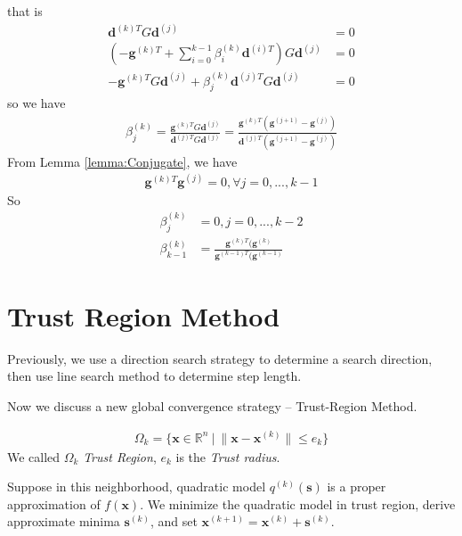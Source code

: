     that is
    \begin{align}
        \mathbf{d}^{(k)T} G \mathbf{d}^{(j)} &= 0 \\
        (-\mathbf{g}^{(k)T} + \sum_{i=0}^{k-1} \beta_i^{(k)} \mathbf{d}^{(i)T})
        G \mathbf{d}^{(j)} &= 0 \\
        -\mathbf{g}^{(k)T} G \mathbf{d}^{(j)}
        + \beta_j^{(k)}\mathbf{d}^{(j)T} G \mathbf{d}^{(j)} &= 0
    \end{align}
    so we have
    \begin{align}
        \beta_j^{(k)} = \frac{\mathbf{g}^{(k)T} G \mathbf{d}^{(j)}}
        {\mathbf{d}^{(j)T} G \mathbf{d}^{(j)}}
        = \frac{\mathbf{g}^{(k)T} (\mathbf{g}^{(j+1)} - \mathbf{g}^{(j)})}
        {\mathbf{d}^{(j)T}(\mathbf{g}^{(j+1)} - \mathbf{g}^{(j)})}
    \end{align}
    From Lemma \ref{lemma:Conjugate}, we have 
    \begin{align}
        \mathbf{g}^{(k)T}\mathbf{g}^{(j)} = 0, \forall j = 0,..., k-1
    \end{align}
    So
    \begin{align}
        \beta_j^{(k)} &= 0, j = 0,...,k-2 \\
        \beta_{k-1}^{(k)} &= \frac{\mathbf{g}^{(k)T} (\mathbf{g}^{(k)}}{\mathbf{g}^{(k-1)T} (\mathbf{g}^{(k-1)}}
    \end{align}

\section{Trust Region Method}
Previously, we use a direction search strategy
to determine a search direction, then use line
search method to determine step length.
\par
Now we discuss a new global convergence strategy --
Trust-Region Method.
\begin{definition}
    \begin{align}
        \Omega_k = \{ \mathbf{x} \in \mathbb{R}^n \ | \ \parallel
        \mathbf{x} - \mathbf{x}^{(k)} \parallel \leq e_k  \}
    \end{align}
    We called $\Omega_k$ \emph{Trust Region}, $e_k$ is the \emph{Trust radius}.
\end{definition}

Suppose in this neighborhood, quadratic model $q^{(k)}(\mathbf{s})$
is a proper approximation of $f(\mathbf{x})$.
We minimize the quadratic model in trust region, derive
approximate minima $\mathbf{s}^{(k)}$,
and set $\mathbf{x}^{(k+1)} = \mathbf{x}^{(k)} + \mathbf{s}^{(k)}$.
\par
